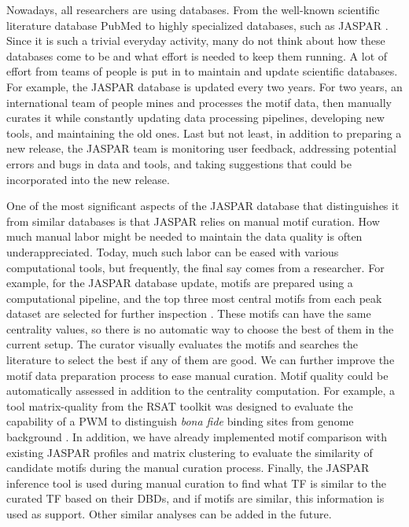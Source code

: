     Nowadays, all researchers are using databases. From the well-known scientific literature database PubMed to highly specialized databases, such as JASPAR \cite{canese2013pubmed,rauluseviciute2024jaspar}. Since it is such a trivial everyday activity, many do not think about how these databases come to be and what effort is needed to keep them running. A lot of effort from teams of people is put in to maintain and update scientific databases. For example, the JASPAR database is updated every two years. For two years, an international team of people mines and processes the motif data, then manually curates it while constantly updating data processing pipelines, developing new tools, and maintaining the old ones. Last but not least, in addition to preparing a new release, the JASPAR team is monitoring user feedback, addressing potential errors and bugs in data and tools, and taking suggestions that could be incorporated into the new release.

    One of the most significant aspects of the JASPAR database that distinguishes it from similar databases is that JASPAR relies on manual motif curation. How much manual labor might be needed to maintain the data quality is often underappreciated. Today, much such labor can be eased with various computational tools, but frequently, the final say comes from a researcher. For example, for the JASPAR database update, motifs are prepared using a computational pipeline, and the top three most central motifs from each peak dataset are selected for further inspection \cite{bailey2012inferring}. These motifs can have the same centrality values, so there is no automatic way to choose the best of them in the current setup. The curator visually evaluates the motifs and searches the literature to select the best if any of them are good. We can further improve the motif data preparation process to ease manual curation. Motif quality could be automatically assessed in addition to the centrality computation. For example, a tool matrix-quality from the RSAT toolkit was designed to evaluate the capability of a PWM to distinguish \textit{bona fide} binding sites from genome background \cite{medina2011theoretical}. In addition, we have already implemented motif comparison with existing JASPAR profiles and matrix clustering to evaluate the similarity of candidate motifs during the manual curation process. Finally, the JASPAR inference tool is used during manual curation to find what TF is similar to the curated TF based on their DBDs, and if motifs are similar, this information is used as support. Other similar analyses can be added in the future.


